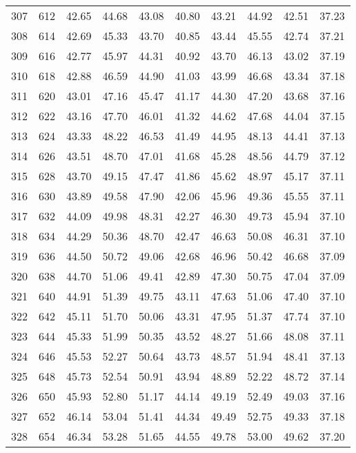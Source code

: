 \begin{longtable}{rrllllllll}
		307 & 612 & 42.65 & 44.68 & 43.08 & 40.80 & 43.21 & 44.92 & 42.51 & 37.23 \\ 
		308 & 614 & 42.69 & 45.33 & 43.70 & 40.85 & 43.44 & 45.55 & 42.74 & 37.21 \\ 
		309 & 616 & 42.77 & 45.97 & 44.31 & 40.92 & 43.70 & 46.13 & 43.02 & 37.19 \\ 
		310 & 618 & 42.88 & 46.59 & 44.90 & 41.03 & 43.99 & 46.68 & 43.34 & 37.18 \\ 
		311 & 620 & 43.01 & 47.16 & 45.47 & 41.17 & 44.30 & 47.20 & 43.68 & 37.16 \\ 
		312 & 622 & 43.16 & 47.70 & 46.01 & 41.32 & 44.62 & 47.68 & 44.04 & 37.15 \\ 
		313 & 624 & 43.33 & 48.22 & 46.53 & 41.49 & 44.95 & 48.13 & 44.41 & 37.13 \\ 
		314 & 626 & 43.51 & 48.70 & 47.01 & 41.68 & 45.28 & 48.56 & 44.79 & 37.12 \\ 
		315 & 628 & 43.70 & 49.15 & 47.47 & 41.86 & 45.62 & 48.97 & 45.17 & 37.11 \\ 
		316 & 630 & 43.89 & 49.58 & 47.90 & 42.06 & 45.96 & 49.36 & 45.55 & 37.11 \\ 
		317 & 632 & 44.09 & 49.98 & 48.31 & 42.27 & 46.30 & 49.73 & 45.94 & 37.10 \\ 
		318 & 634 & 44.29 & 50.36 & 48.70 & 42.47 & 46.63 & 50.08 & 46.31 & 37.10 \\ 
		319 & 636 & 44.50 & 50.72 & 49.06 & 42.68 & 46.96 & 50.42 & 46.68 & 37.09 \\ 
		320 & 638 & 44.70 & 51.06 & 49.41 & 42.89 & 47.30 & 50.75 & 47.04 & 37.09 \\ 
		321 & 640 & 44.91 & 51.39 & 49.75 & 43.11 & 47.63 & 51.06 & 47.40 & 37.10 \\ 
		322 & 642 & 45.11 & 51.70 & 50.06 & 43.31 & 47.95 & 51.37 & 47.74 & 37.10 \\ 
		323 & 644 & 45.33 & 51.99 & 50.35 & 43.52 & 48.27 & 51.66 & 48.08 & 37.11 \\ 
		324 & 646 & 45.53 & 52.27 & 50.64 & 43.73 & 48.57 & 51.94 & 48.41 & 37.13 \\ 
		325 & 648 & 45.73 & 52.54 & 50.91 & 43.94 & 48.89 & 52.22 & 48.72 & 37.14 \\ 
		326 & 650 & 45.93 & 52.80 & 51.17 & 44.14 & 49.19 & 52.49 & 49.03 & 37.16 \\ 
		327 & 652 & 46.14 & 53.04 & 51.41 & 44.34 & 49.49 & 52.75 & 49.33 & 37.18 \\ 
		328 & 654 & 46.34 & 53.28 & 51.65 & 44.55 & 49.78 & 53.00 & 49.62 & 37.20 \\ 

\end{longtable}
